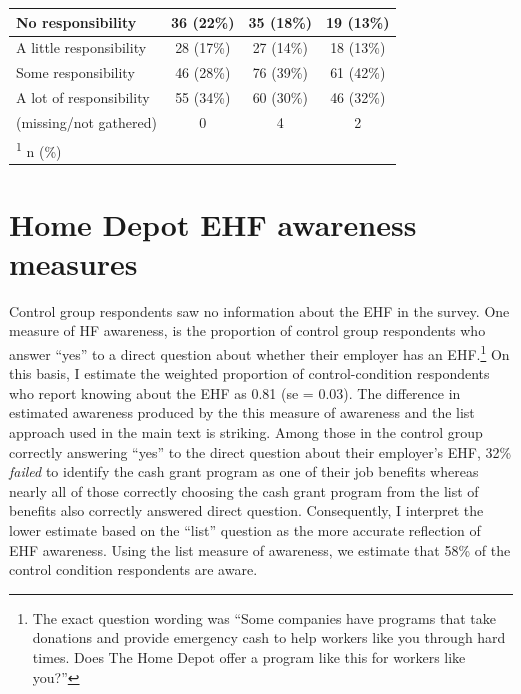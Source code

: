 \documentclass[
  11pt,
  oneside]{article}
\begin{document}
\begin{table}
\begin{tabular}[t]{l|c|c|c}
\hline
\hspace{1em}No responsibility & 36 (22\%) & 35 (18\%) & 19 (13\%)\\
\hline
\hspace{1em}A little responsibility & 28 (17\%) & 27 (14\%) & 18 (13\%)\\
\hline
\hspace{1em}Some responsibility & 46 (28\%) & 76 (39\%) & 61 (42\%)\\
\hline
\hspace{1em}A lot of responsibility & 55 (34\%) & 60 (30\%) & 46 (32\%)\\
\hline
\hspace{1em}(missing/not gathered) & 0 & 4 & 2\\
\hline
\multicolumn{4}{l}{\rule{0pt}{1em}\textsuperscript{1} n (\%)}\\
\end{tabular}
\end{table}

\newpage

\section{Home Depot EHF awareness measures}\label{app-HFaware}

Control group respondents saw no information about the EHF in the survey. One measure of HF awareness, is the proportion of control group respondents who answer ``yes'' to a direct question about whether their employer has an EHF.\footnote{The exact question wording was ``Some companies have programs that take donations and provide emergency cash to help workers like you through hard times. Does The Home Depot offer a program like this for workers like you?''} On this basis, I estimate the weighted proportion of control-condition respondents who report knowing about the EHF as 0.81 (se = 0.03). The difference in estimated awareness produced by the this measure of awareness and the list approach used in the main text is striking. Among those in the control group correctly answering ``yes'' to the direct question about their employer's EHF, 32\% \emph{failed} to identify the cash grant program as one of their job benefits whereas nearly all of those correctly choosing the cash grant program from the list of benefits also correctly answered direct question. Consequently, I interpret the lower estimate based on the ``list'' question as the more accurate reflection of EHF awareness. Using the list measure of awareness, we estimate that 58\% of the control condition respondents are aware.
\end{document}
